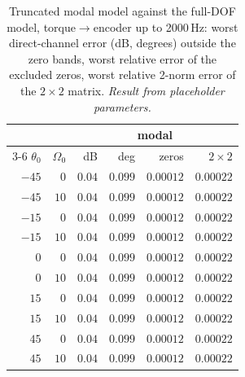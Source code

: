 \documentclass[10pt,a4paper]{article}
\numberwithin{equation}{section}
\begin{document}
\begin{table}[H]\centering\small\setlength{\tabcolsep}{4pt}
\caption{Truncated modal model against the full-DOF model, torque$\to$encoder up to 2000\,Hz: worst direct-channel error (dB, degrees) outside the zero bands, worst relative error of the excluded zeros, worst relative 2-norm error of the $2\times2$ matrix. \emph{Result from placeholder parameters.}}\label{tab:modal_vs_full}
\begin{tabular}{rrrrrr}\toprule
& & \multicolumn{4}{c}{modal} \\ \cmidrule(lr){3-6}
$\theta_0$ & $\Omega_0$ & dB & deg & zeros & $2\times2$ \\ \midrule
$-45$ & $0$ & $0.04$ & $0.099$ & $0.00012$ & $0.00022$ \\
$-45$ & $10$ & $0.04$ & $0.099$ & $0.00012$ & $0.00022$ \\
$-15$ & $0$ & $0.04$ & $0.099$ & $0.00012$ & $0.00022$ \\
$-15$ & $10$ & $0.04$ & $0.099$ & $0.00012$ & $0.00022$ \\
$0$ & $0$ & $0.04$ & $0.099$ & $0.00012$ & $0.00022$ \\
$0$ & $10$ & $0.04$ & $0.099$ & $0.00012$ & $0.00022$ \\
$15$ & $0$ & $0.04$ & $0.099$ & $0.00012$ & $0.00022$ \\
$15$ & $10$ & $0.04$ & $0.099$ & $0.00012$ & $0.00022$ \\
$45$ & $0$ & $0.04$ & $0.099$ & $0.00012$ & $0.00022$ \\
$45$ & $10$ & $0.04$ & $0.099$ & $0.00012$ & $0.00022$ \\
\bottomrule\end{tabular}\end{table}
\end{document}
